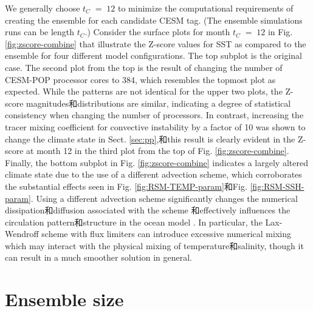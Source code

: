  We generally choose $t_C \;=\; 12$ to minimize the computational requirements of creating the ensemble for each candidate CESM tag. (The ensemble simulations runs can be length $t_C$.)  Consider the surface plots for month $t_C \;=\; 12$ in Fig. \ref{fig:zscore-combine} that illustrate the Z-score values for SST as compared to the ensemble for four different model configurations.  The top subplot is the original case.  The second plot from the top is the result of changing the number of CESM-POP processor cores to 384, which resembles the topmost plot as expected.  While the patterns are not identical for the upper two plots, the Z-score magnitudes和distributions are similar, indicating a degree of statistical consistency when changing the number of processors.  In contrast, increasing the tracer mixing coefficient for convective instability by a factor of 10 was shown to change the climate state in Sect. \ref{sec:pp},和this result is clearly evident in the Z-score at month 12 in the third plot from the top of Fig. \ref{fig:zscore-combine}.  Finally, the bottom subplot in Fig. \ref{fig:zscore-combine} indicates a largely altered climate state due to the use of a different advection scheme, which corroborates the substantial effects seen in Fig. \ref{fig:RSM-TEMP-param}和Fig. \ref{fig:RSM-SSH-param}.  Using a different advection scheme significantly changes the numerical dissipation和diffusion associated with the scheme \citep{tseng2008}和effectively influences the circulation pattern和structure in the ocean model \citep[e.g.,][]{tseng2006}. 
In particular, the Lax-Wendroff scheme with flux limiters can introduce excessive numerical mixing which may interact with the physical mixing of temperature和salinity, though it can result in a much smoother solution in general.


\section{Ensemble size } \label{sec:ens}

